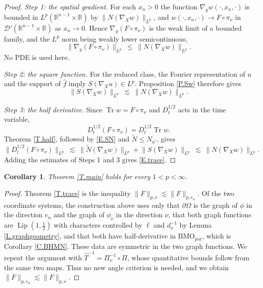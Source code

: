 \documentclass[10pt,a4paper]{amsart}
\numberwithin{equation}{section}
\DeclareMathOperator{\Lip}{Lip}
\newcommand{\R}{\mathbb R}
\newcommand{\wh}{\widehat}
\newcommand{\br}[1]{\left(#1\right)}
\newcommand{\pom}{\partial\Omega}
\newcommand{\dhalf}{D_t^{1/2}}
\newcommand{\BMOpar}{\mathrm{BMO}_{\mathrm{par}}}
\newcommand{\Nt}{\widetilde N}
\newtheorem{corollary}[equation]{Corollary}
\begin{document}
\begin{proof}
\noindent\emph{Step 1: the spatial gradient.} For each $x_n>0$ the function
$\nabla_yw(\cdot,x_n,\cdot)$ is bounded in $L^p(\R^{n-1}\times\R)$ by
$\|N(\nabla_Xw)\|_{L^p}$, and $w(\cdot,x_n,\cdot)\to F\circ\pi_\nu$ in
$\mathcal D'(\R^{n-1}\times\R)$ as $x_n\to0$. Hence
$\nabla_y(F\circ\pi_\nu)$ is the weak limit of a bounded family, and the $L^p$
norm being weakly lower semicontinuous,
$$\big\|\nabla_y\br{F\circ\pi_\nu}\big\|_{L^p}\ \le\
  \big\|N(\nabla_Xw)\big\|_{L^p} .$$
No PDE is used here.\medskip

\noindent\emph{Step 2: the square function.} For the reduced class, the
Fourier representation of $u$ and the support of $\wh f$ imply
$S(\nabla_Xu)\in L^p$. Proposition \ref{P.Sw} therefore gives
\begin{equation}\label{E.SN}
  \big\|S(\nabla_Xw)\big\|_{L^p}\ \lesssim\ \big\|N(\nabla_Xw)\big\|_{L^p} .
\end{equation}

\noindent\emph{Step 3: the half derivative.} Since
$\operatorname{Tr}w=F\circ\pi_\nu$ and $\dhalf$ acts in the time variable,
$$\dhalf\br{F\circ\pi_\nu}=\dhalf\operatorname{Tr}w.$$
Theorem \ref{T.half}, followed by \eqref{E.SN} and $\Nt\le N_{a'}$, gives
$$\big\|\dhalf\br{F\circ\pi_\nu}\big\|_{L^p}\ \lesssim\
  \big\|\Nt(\nabla_Xw)\big\|_{L^p}+\big\|S(\nabla_Xw)\big\|_{L^p}
  \ \lesssim\ \big\|N(\nabla_Xw)\big\|_{L^p} .$$
Adding the estimates of Steps 1 and 3 gives \eqref{E.trace}.
\end{proof}

\begin{corollary}\label{C.frame}
Theorem \ref{T.main} holds for every $1<p<\infty$.
\end{corollary}

\begin{proof}
Theorem \ref{T.trace} is the inequality $\|F\|_{p,\nu}\lesssim\|F\|_{p,e_n}$.
Of the two coordinate systems, the construction above uses only that $\pom$ is
the graph of $\phi$ in the direction $e_n$ and the graph of $\phi_\nu$ in the
direction $\nu$, that both graph functions are $\Lip(1,\tfrac12)$ with
characters controlled by $\ell$ and $d_\nu^{-1}$ by Lemma
\ref{L.graphgeometry}, and that both have
half-derivative in $\BMOpar$, which is Corollary \ref{C.BHMN}. These data are
symmetric in the two graph functions. We repeat the argument with
$\widehat T^{-1}=\Pi_\nu^{-1}\circ\Pi$, whose quantitative bounds follow from
the same two maps. Thus no new angle criterion is needed, and we obtain
$\|F\|_{p,e_n}\lesssim\|F\|_{p,\nu}$.
\end{proof}
\end{document}
